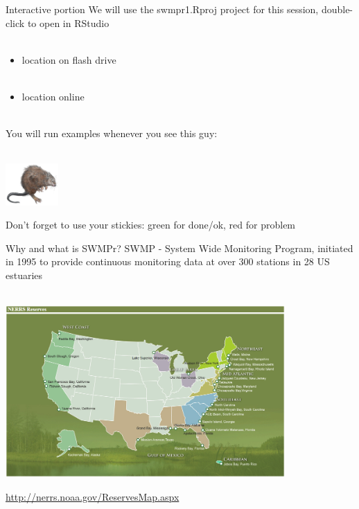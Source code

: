 \documentclass[xcolor=dvipsnames]{beamer}\usepackage[]{graphicx}\usepackage[]{color}
\begin{document}
\begin{frame}{Interactive portion}
\onslide<+->
We will use the swmpr1.Rproj project for this session, double-click to open in RStudio \\~\\
\begin{itemize}
\item location on flash drive\\~\\
\item location online \\~\\
\end{itemize}
\onslide<+->
You will run examples whenever you see this guy: \\~\\
\centerline{\includegraphics[width = 0.15\textwidth]{imgs/swmprat.png}} 
Don't forget to use your stickies: {\color{green} green} for done/ok, {\color{red} red} for problem
\end{frame}

\begin{frame}{Why and what is SWMPr?}
SWMP - System Wide Monitoring Program, initiated in 1995 to provide continuous monitoring data at over 300 stations in 28 US estuaries \\~\\
\centerline{\includegraphics[width = 0.8\textwidth]{imgs/NERRS_locations.png}}
\tiny
\flushright
\href{http://nerrs.noaa.gov/ReservesMap.aspx}{http://nerrs.noaa.gov/ReservesMap.aspx}
\end{frame}
\end{document}
